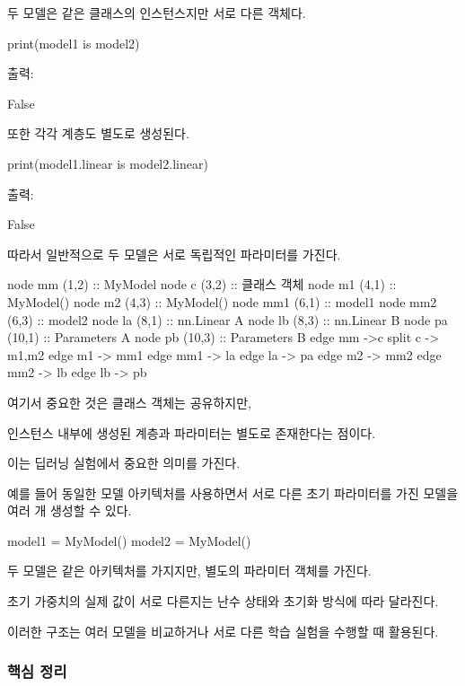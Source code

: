 두 모델은 같은 클래스의 인스턴스지만 서로 다른 객체다.

\begin{dhkcode}
print(model1 is model2)
\end{dhkcode}

출력:

\begin{dhkzsh}
False
\end{dhkzsh}

또한 각각  계층도 별도로 생성된다.

\begin{dhkcode}
print(model1.linear is model2.linear)
\end{dhkcode}

출력:

\begin{dhkzsh}
False
\end{dhkzsh}

따라서 일반적으로 두 모델은 서로 독립적인 파라미터를 가진다.

\begin{dhkdiagram}[in=6]
node mm (1,2) :: MyModel
node c (3,2) :: 클래스 객체
node m1 (4,1) :: MyModel()
node m2 (4,3) :: MyModel()
node mm1 (6,1) :: model1
node mm2 (6,3) :: model2
node la (8,1) :: nn.Linear A
node lb (8,3) :: nn.Linear B
node pa (10,1) :: Parameters A
node pb (10,3) :: Parameters B
edge mm ->c
split c -> m1,m2
edge m1 -> mm1
edge mm1 -> la
edge la -> pa
edge m2 -> mm2
edge mm2 -> lb
edge lb -> pb
\end{dhkdiagram}

여기서 중요한 것은 클래스 객체는 공유하지만,

인스턴스 내부에 생성된 계층과 파라미터는 별도로 존재한다는 점이다.

이는 딥러닝 실험에서 중요한 의미를 가진다.

예를 들어 동일한 모델 아키텍처를 사용하면서 서로 다른 초기 파라미터를 가진 모델을 여러 개 생성할 수 있다.

\begin{dhkcode}
model1 = MyModel()
model2 = MyModel()
\end{dhkcode}

두 모델은 같은 아키텍처를 가지지만, 별도의 파라미터 객체를 가진다.

초기 가중치의 실제 값이 서로 다른지는 난수 상태와 초기화 방식에 따라 달라진다.

이러한 구조는 여러 모델을 비교하거나 서로 다른 학습 실험을 수행할 때 활용된다.

\subsubsection{핵심 정리}

